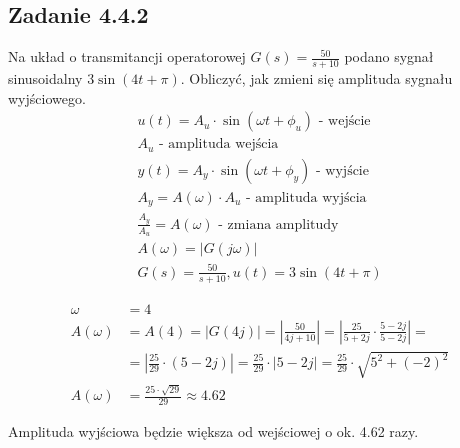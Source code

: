 \pagebreak
\subsection*{Zadanie 4.4.2}
 {\color{darkgray}
	Na układ o transmitancji operatorowej $G(s) = \frac{50}{s+10}$ podano sygnał sinusoidalny $3\sin{(4t+\pi)}$. Obliczyć, jak zmieni się amplituda sygnału wyjściowego.\\
}\lineh
\begin{gather*}
u(t) = A_u \cdot \sin{(\omega t+\phi_u)}\text{ - wejście} \\
A_u \text{ - amplituda wejścia} \\
y(t) = A_y \cdot \sin{(\omega t+\phi_y)}\text{ - wyjście} \\
A_y = A(\omega) \cdot A_u \text{ - amplituda wyjścia} \\
\frac{A_y}{A_u} = A(\omega) \text{ - zmiana amplitudy} \\
A(\omega) = |G(j\omega)| \\
G(s) = \frac{50}{s+10}, u(t) = 3\sin{(4t+\pi)}
\end{gather*}

\begin{align*}
\omega & = 4 \\
A(\omega) & = A(4) = |G(4j)| = \left| \frac{50}{4j+10} \right| = \left| \frac{25}{5+2j} \cdot \frac{5-2j}{5-2j} \right| = \\
& = \left| \frac{25}{29} \cdot (5-2j) \right| = \frac{25}{29} \cdot |5-2j| = \frac{25}{29} \cdot \sqrt{5^2+(-2)^2} \\
A(\omega) & = \boxed{ \frac{25 \cdot \sqrt{29}}{29} } \approx 4.62
\end{align*}

Amplituda wyjściowa będzie większa od wejściowej o ok. 4.62 razy.

\pagebreak
